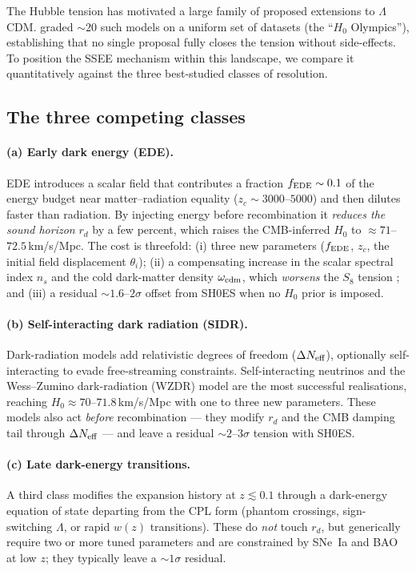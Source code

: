 \documentclass[12pt,a4paper]{article}
\begin{document}
The Hubble tension has motivated a large family of proposed extensions to
$\Lambda$CDM.  \citet{Schoneberg2022} graded $\sim 20$ such models on a uniform
set of datasets (the ``$H_0$ Olympics''), establishing that no single proposal
fully closes the tension without side-effects.  To position the SSEE mechanism
within this landscape, we compare it quantitatively against the three best-studied
classes of resolution.

\subsection{The three competing classes}
\label{sec:competitors}

\paragraph{(a) Early dark energy (EDE).}
EDE \citep{Karwal2016,Poulin2019,Smith2020} introduces a scalar field that
contributes a fraction $f_{\rm EDE}\sim 0.1$ of the energy budget near
matter--radiation equality ($z_c \sim 3000$--$5000$) and then dilutes faster
than radiation.  By injecting energy before recombination it \emph{reduces the
sound horizon} $r_d$ by a few percent, which raises the CMB-inferred $H_0$ to
$\approx 71$--$72.5$\,km/s/Mpc.  The cost is threefold: (i) three new parameters
($f_{\rm EDE}$, $z_c$, the initial field displacement $\theta_i$); (ii) a
compensating increase in the scalar spectral index $n_s$ and the cold
dark-matter density $\omega_{\rm cdm}$, which \emph{worsens} the $S_8$ tension
\citep{Hill2020}; and (iii) a residual $\sim 1.6$--$2\sigma$ offset from SH0ES
when no $H_0$ prior is imposed.

\paragraph{(b) Self-interacting dark radiation (SIDR).}
Dark-radiation models add relativistic degrees of freedom ($\Delta N_{\rm eff}$),
optionally self-interacting to evade free-streaming constraints.
Self-interacting neutrinos \citep{Kreisch2020} and the Wess--Zumino dark-radiation
(WZDR) model \citep{Aloni2022} are the most successful realisations, reaching
$H_0 \approx 70$--$71.8$\,km/s/Mpc with one to three new parameters.
These models also act \emph{before} recombination --- they modify $r_d$ and the
CMB damping tail through $\Delta N_{\rm eff}$ --- and leave a residual
$\sim 2$--$3\sigma$ tension with SH0ES.

\paragraph{(c) Late dark-energy transitions.}
A third class modifies the expansion history at $z \lesssim 0.1$ through a
dark-energy equation of state departing from the CPL form (phantom crossings,
sign-switching $\Lambda$, or rapid $w(z)$ transitions).  These do \emph{not}
touch $r_d$, but generically require two or more tuned parameters and are
constrained by SNe~Ia and BAO at low $z$; they typically leave a $\sim 1\sigma$
residual.
\end{document}

